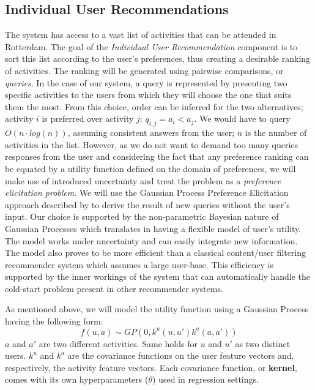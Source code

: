 \documentclass[11pt,a4paper,oneside]{article}
\begin{document}
\subsection{Individual User Recommendations}
The system has access to a vast list of activities that can be attended in Rotterdam. The goal of the \emph{Individual User Recommendation} component is to sort this list according to the user's preferences, thus creating a desirable ranking of activities. The ranking will be generated using pairwise comparisons, or \emph{queries}. In the case of our system, a query is represented by presenting two specific activities to the users from which they will choose the one that suits them the most. From this choice, order can be inferred for the two alternatives; activity $i$ is preferred over activity $j$: $q_{i,j} = a_i < a_j$.  We would have to query $O(n\cdot log(n))$, assuming consistent answers from the user; $n$ is the number of activities in the list. However, as we do not want to demand too many queries responses from the user and considering the fact that any preference ranking can be equated by a utility function defined on the domain of preferences, we will make use of introduced uncertainty and treat the problem as a \emph{preference elicitation problem}. We will use the Gaussian Process Preference Elicitation approach described by \citeauthor{guo_GaussianProcessPreference_2010} \cite{guo_GaussianProcessPreference_2010} to derive the result of new queries without the user's input. Our choice is supported by the non-parametric Bayesian nature of Gaussian Processes which translates in having a flexible model of user's utility. The model works under uncertainty and can easily integrate new information. The model also proves to be more efficient than a classical content/user filtering recommender system which assumes a large user-base. This efficiency is supported by the inner workings of the system that can automatically handle the cold-start problem present in other recommender systems.

As mentioned above, we will model the utility function using a Gaussian Process having the following form:
\begin{equation}
    \label{gp}
    f(u, a) \sim GP(0, k^u(u,u')k^a(a, a'))
\end{equation}
$a$ and $a'$ are two different activities. Same holds for $u$ and $u'$ as two distinct users. $k^u$ and $k^a$ are the covariance functions on the user feature vectors and, respectively, the activity feature vectors. Each covariance function, or \textbf{kernel}, comes with its own hyperparameters ($\theta$) used in regression settings.
\end{document}
